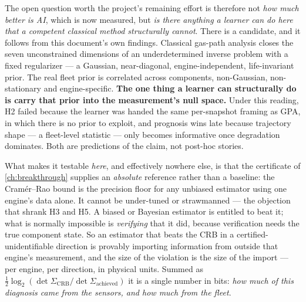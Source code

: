The open question worth the project's remaining effort is therefore not \emph{how much better
is AI}, which is now measured, but \emph{is there anything a learner can do here that a
competent classical method structurally cannot}. There is a candidate, and it follows from
this document's own findings. Classical gas-path analysis closes the seven unconstrained
dimensions of an underdetermined inverse problem with a fixed regularizer --- a Gaussian,
near-diagonal, engine-independent, life-invariant prior. The real fleet prior is correlated
across components, non-Gaussian, non-stationary and engine-specific. \textbf{The one thing a
learner can structurally do is carry that prior into the measurement's null space.} Under this
reading, H2 failed because the learner was handed the same per-snapshot framing as GPA, in
which there is no prior to exploit, and prognosis wins late because trajectory shape --- a
fleet-level statistic --- only becomes informative once degradation dominates. Both are
predictions of the claim, not post-hoc stories.

What makes it testable \emph{here}, and effectively nowhere else, is that the certificate of
\cref{ch:breakthrough} supplies an \emph{absolute} reference rather than a baseline: the
Cram\'er--Rao bound is the precision floor for any unbiased estimator using one engine's data
alone. It cannot be under-tuned or strawmanned --- the objection that shrank H3 and H5. A
biased or Bayesian estimator is entitled to beat it; what is normally impossible is
\emph{verifying} that it did, because verification needs the true component state. So an
estimator that beats the CRB in a certified-unidentifiable direction is provably importing
information from outside that engine's measurement, and the size of the violation is the size
of the import --- per engine, per direction, in physical units. Summed as
$\frac{1}{2}\log_2(\det\Sigma_{\text{CRB}} / \det\Sigma_{\text{achieved}})$ it is a single
number in bits: \emph{how much of this diagnosis came from the sensors, and how much from the
fleet}.

